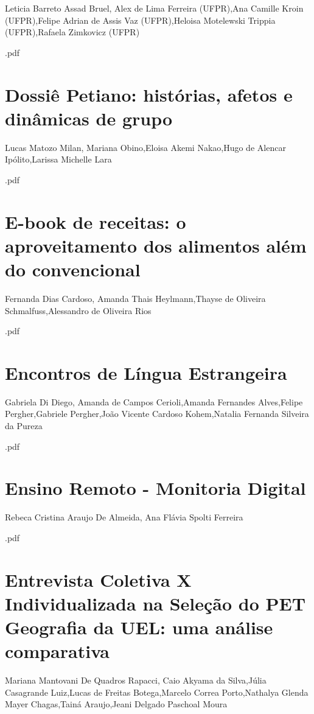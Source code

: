 Leticia Barreto Assad Bruel, Alex de Lima Ferreira (UFPR),Ana Camille Kroin (UFPR),Felipe Adrian de Assis Vaz (UFPR),Heloisa Motelewski Trippia (UFPR),Rafaela Zimkovicz (UFPR)



.pdf\section{Dossiê Petiano: histórias, afetos e dinâmicas de grupo}

Lucas Matozo Milan, Mariana Obino,Eloisa Akemi Nakao,Hugo de Alencar Ipólito,Larissa Michelle Lara



.pdf\section{E-book de receitas: o aproveitamento dos alimentos além do convencional}

Fernanda Dias Cardoso, Amanda Thais Heylmann,Thayse de Oliveira Schmalfuss,Alessandro de Oliveira Rios



.pdf\section{Encontros de Língua Estrangeira}

Gabriela Di Diego, Amanda de Campos Cerioli,Amanda Fernandes Alves,Felipe Pergher,Gabriele Pergher,João Vicente Cardoso Kohem,Natalia Fernanda Silveira da Pureza



.pdf\section{Ensino Remoto - Monitoria Digital}

Rebeca Cristina Araujo De Almeida, Ana Flávia Spolti Ferreira



.pdf\section{Entrevista Coletiva X Individualizada na Seleção do PET Geografia da UEL: uma análise comparativa}

Mariana Mantovani De Quadros Rapacci, Caio Akyama da Silva,Júlia Casagrande Luiz,Lucas de Freitas Botega,Marcelo Correa Porto,Nathalya Glenda Mayer Chagas,Tainá Araujo,Jeani Delgado Paschoal Moura

